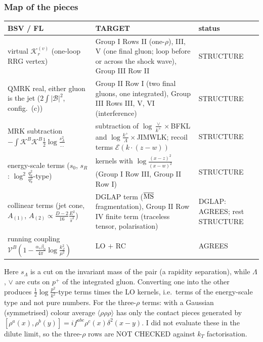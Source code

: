 \subsubsection{Map of the pieces}
\begin{center}
\renewcommand{\arraystretch}{1.25}
\begin{tabular}{|p{}|p{}|p{}|}\hline
BSV / FL & TARGET & status\\\hline
virtual $\mathcal K^{(v)}_{r}$ (one-loop RRG vertex) & Group I Rows II (one-$\rho$), III, V (one final gluon; loop before or across the shock wave), Group III Row II & STRUCTURE\\
QMRK real, either gluon is the jet ($2\int|\mathcal B|^{2}$, config.\ (c)) & Group II Row I (two final gluons, one integrated), Group III Rows III, V, VI (interference) & STRUCTURE\\
MRK subtraction $-\int\mathcal K^{B}\mathcal K^{B}\frac12\log\frac{s_{\Lambda}^{2}}{\dots}$ & subtraction of $\log\frac{\vee}{k^{+}}\times$BFKL and $\log\frac{k^{+}}{\Lambda}\times$JIMWLK; recoil terms $\mathcal E(k\cdot(z-w))$ & STRUCTURE\\
energy-scale terms ($s_{0}$, $s_{R}$: $\log^{2}\frac{q_{a}^{2}}{q_{b}^{2}}$-type) & kernels with $\log\frac{(x-z)^{2}}{(x-w)^{2}}$ (Group I Row III, Group II Row I) & STRUCTURE\\
collinear terms (jet cone, $A_{(1)}$, $A_{(2)}\propto\frac{D-2}{16}\frac{E^{2}}{\hat s^{2}}$) & DGLAP term ($\overline{\rm MS}$ fragmentation), Group II Row IV finite term (traceless tensor, polarisation) & DGLAP: AGREES; rest STRUCTURE\\
running coupling $\mathcal V^{B}(1-\frac{\alpha_{s}\beta_{0}}{4\pi}\log\frac{k_{J}^{2}}{\mu^{2}})$ & LO $+$ RC & AGREES\\\hline
\end{tabular}
\end{center}
Here $s_{\Lambda}$ is a cut on the invariant mass of the pair (a rapidity separation), while $\Lambda$, $\vee$ are cuts on $p^{+}$ of the integrated gluon. Converting one into the other produces $\frac12\log\frac{p^{2}}{k^{2}}$-type terms times the LO kernels, i.e.\ terms of the energy-scale type and not pure numbers. For the three-$\rho$ terms: with a Gaussian (symmetrised) colour average $\langle\rho\rho\rho\rangle$ has only the contact pieces generated by $[\rho^{a}(x),\rho^{b}(y)]=if^{abc}\rho^{c}(x)\delta^{2}(x-y)$. I did not evaluate these in the dilute limit, so the three-$\rho$ rows are NOT CHECKED against $k_{T}$ factorisation.

